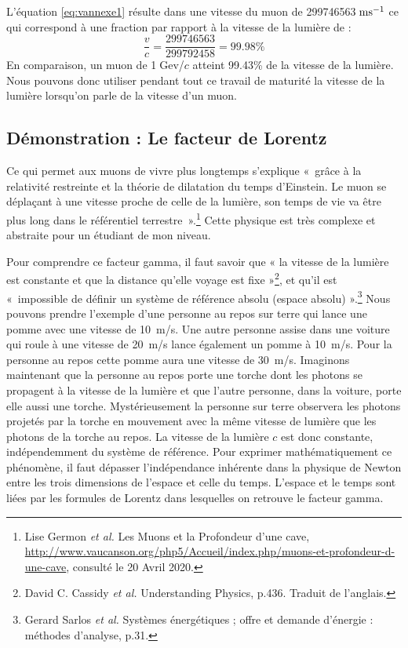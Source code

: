 \documentclass[a4paper, 12pt]{article}
\begin{document}
\begin{spacing}{1.5}
L'équation \ref{eq:vannexe1} résulte dans une vitesse du muon de 299746563$\;{\rm ms^{-1}}$ ce qui correspond à une fraction par rapport à la vitesse de la lumière de :
\begin{equation}
\frac{v}{c} = \frac{299746563}{299792458} = 99.98\% \label{eq:v/c}
\end{equation}
En comparaison, un muon de 1$\;$Gev/$c$ atteint 99.43\% de la vitesse de la lumière. Nous pouvons donc utiliser pendant tout ce travail de maturité la vitesse de la lumière lorsqu'on parle de la vitesse d'un muon. 

\subsection{Démonstration : Le facteur de Lorentz}
\label{annexes 2}

Ce qui permet aux muons de vivre plus longtemps s'explique «~grâce à la relativité restreinte et la théorie de dilatation du temps d'Einstein. Le muon se déplaçant à une vitesse proche de celle de la lumière, son temps de vie va être plus long dans le référentiel terrestre~».\footnote{Lise Germon \emph{et al.} Les Muons et la Profondeur d'une cave, \url{http://www.vaucanson.org/php5/Accueil/index.php/muons-et-profondeur-d-une-cave}, consulté le 20 Avril 2020.} Cette physique est très complexe et abstraite pour un étudiant de mon niveau. 

Pour comprendre ce facteur gamma, il faut savoir que « la vitesse de la lumière est constante et que la distance qu'elle voyage est fixe »\footnote{David C. Cassidy \emph{et al.} Understanding Physics, p.436. Traduit de l'anglais.}, et qu'il est «~impossible de définir un système de référence absolu (espace absolu) ».\footnote{Gerard Sarlos \emph{et al.} Systèmes énergétiques ; offre et demande d'énergie : méthodes d'analyse, p.31.} Nous pouvons prendre l'exemple d'une personne au repos sur terre qui lance une pomme avec une vitesse de 10~m/s. Une autre personne assise dans une voiture qui roule à une vitesse de 20~m/s lance également un pomme à 10~m/s. Pour la personne au repos cette pomme aura une vitesse de 30~m/s. Imaginons maintenant que la personne au repos porte une torche dont les photons se propagent à la vitesse de la lumière et que l'autre personne, dans la voiture, porte elle aussi une torche. Mystérieusement la personne sur terre observera les photons projetés par la torche en mouvement avec la même vitesse de lumière que les photons de la torche au repos. La vitesse de la lumière $c$ est donc constante, indépendemment du système de référence. Pour exprimer mathématiquement ce phénomène, il faut dépasser l'indépendance inhérente dans la physique de Newton entre les trois dimensions de l'espace et celle du temps. L'espace et le temps sont liées par les formules de Lorentz dans lesquelles on retrouve le facteur gamma.


\end{spacing}
\end{document}
